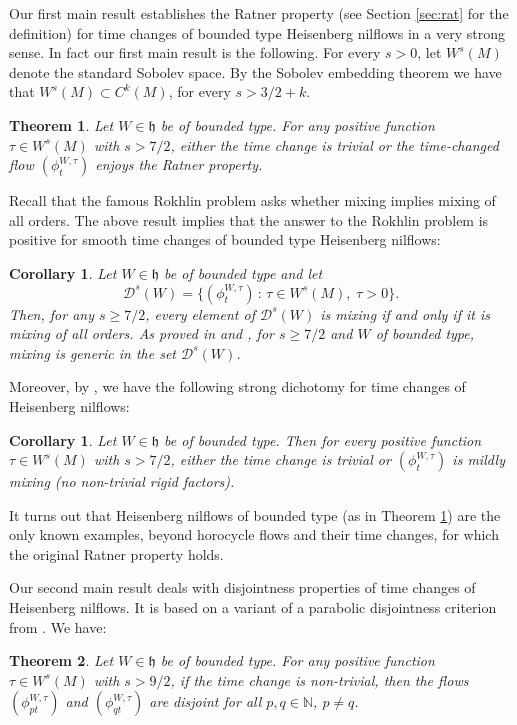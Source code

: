 \documentclass[10pt]{amsart}
\let\mathcal\mathscr
\newcommand{\sep}{\,:\,}
\theoremstyle{definition}
\theoremstyle{plain}
\newtheorem{theorem}{Theorem}
\newtheorem{corollary}[definition]{Corollary}
\newcommand\NN{\mathbb{N}}
\newcommand{\cD}{\mathcal D}
\begin{document}
Our first main result establishes the Ratner property (see Section \ref{sec:rat} for the definition) for time changes of bounded type Heisenberg nilflows in a very strong sense. In fact our first main result is the following.
For every $s>0$, let $W^s(M)$ \hbox{denote} the standard Sobolev space. By the Sobolev embedding theorem we have that $W^s(M) \subset C^k(M)$, for every $s> 3/2 + k$.

\begin{theorem}\label{main:thm'} Let $W\in \mathfrak h$ be of bounded type. For any positive function $\tau\in W^s(M)$ with $s>7/2$, either the time change is trivial or the time-changed flow $(\phi_t^{W,\tau})$ enjoys the Ratner property.
\end{theorem}

Recall that the famous Rokhlin problem asks whether mixing implies mixing of all orders.
The above result implies that the answer to the Rokhlin problem is positive for smooth time changes of bounded type Heisenberg nilflows:
\begin{corollary} Let $W\in \mathfrak h$ be of bounded type and let
\[
\cD^s(W)=\{(\phi_t^{W,\tau})\sep \tau\in W^s(M),\; \tau>0\}.
\]
Then, for any $s\geq 7/2$, every element of $\cD^s(W)$ is mixing if and only if it is mixing of all orders.
As proved in \cite{AFU} and \cite{FK}, for $s\geq 7/2$ and $W$ of bounded type, mixing is generic in the set $\cD^s(W)$.
\end{corollary}

Moreover, by \cite{KL}, we have the following strong dichotomy for time changes of Heisenberg nilflows:
\begin{corollary}\label{corA} Let $W\in \mathfrak h$ be of bounded type. Then for every positive function $\tau\in W^s(M)$ with $s>7/2$, either
the time change is trivial or $(\phi_t^{W,\tau})$ is mildly mixing (no non-trivial rigid factors).
\end{corollary}

It turns out that Heisenberg nilflows of bounded type (as in Theorem \ref{main:thm'}) are the only known examples, beyond horocycle flows and their time changes, for which the original Ratner property holds.

Our second main result deals with disjointness properties of time changes of Heisenberg nilflows. It is based on a variant of a parabolic disjointness criterion from \cite{KLU}. We have:


\begin{theorem}\label{thm:main2'} Let $W\in \mathfrak h$ be of bounded type. For any positive function $\tau\in W^s(M)$ with $s>9/2$, if the time change is non-trivial, then the flows $(\phi_{pt}^{W,\tau})$ and $(\phi_{qt}^{W,\tau})$ are disjoint for
all $p,q\in \NN$, $p\neq q$.
\end{theorem}
\end{document}
